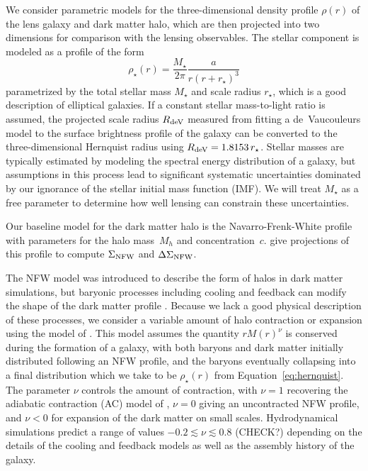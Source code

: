 \documentclass[12pt]{emulateapj}
\begin{document}
We consider parametric models for the three-dimensional density
profile $\rho(r)$ of the lens galaxy and dark matter halo, which are
then projected into two dimensions for comparison with the lensing
observables. The stellar component is modeled as a
\citet{Hernquist1990} profile of the form
\begin{equation}
\rho_{\star}(r) = \frac{M_{\star}}{2\pi} \frac{a}{r(r+r_{\star})^3}
\label{eq:hernquist}
\end{equation}
parametrized by the total stellar mass $M_{\star}$ and scale radius
$r_{\star}$, which is a good description of elliptical galaxies. If a
constant stellar mass-to-light ratio is assumed, the 
projected scale radius $R_{\rm deV}$ measured from fitting a
de~Vaucouleurs model to the surface brightness profile of the galaxy
can be converted to the three-dimensional Hernquist radius using $R_{\rm
  deV}=1.8153\,r_{\star}$. Stellar masses are typically
estimated by modeling the spectral energy distribution of a galaxy,
but assumptions in this process lead to significant systematic
uncertainties dominated by our ignorance of the stellar initial mass
function (IMF). We will treat $M_{\star}$ as a free parameter to
determine how well lensing can constrain these uncertainties.

Our baseline model for the dark matter halo is the Navarro-Frenk-White
\citep[NFW, ][]{Navarro1996} profile with parameters for the halo
mass~$M_{h}$ and concentration~$c$. \citet{Wright2000} give
projections of this profile to compute $\Sigma_{\rm NFW}$ and
$\Delta\Sigma_{\rm NFW}$.

The NFW model was introduced to describe the form of halos in dark
matter simulations, but baryonic processes
including cooling and feedback can modify the shape of the dark matter
profile \citep[e.g.,][]{Blumenthal1986, Gao2004, Gnedin2004,
  Johansson2009, Abadi2010, Gnedin2011}. Because we lack a good
physical description of these processes, we consider a variable amount
of halo contraction or expansion using the model of
\citet{Dutton2007}. This model assumes the quantity $rM(r)^\nu$ is
conserved during the formation of a galaxy, with both baryons and dark
matter initially distributed following an NFW profile, and the baryons
eventually collapsing into a final distribution which we take to be
$\rho_{\star}(r)$ from Equation~\ref{eq:hernquist}. The parameter
$\nu$ controls the amount of contraction, with $\nu=1$ recovering the
adiabatic contraction (AC) model of \citet{Blumenthal1986}, $\nu=0$ giving an
uncontracted NFW profile, and $\nu<0$ for expansion of the dark matter
on small scales. Hydrodynamical simulations predict a range of values
$-0.2\lesssim \nu \lesssim 0.8$ (CHECK?) depending on the details of
the cooling and feedback models as well as the assembly history of the
galaxy.
\end{document}
